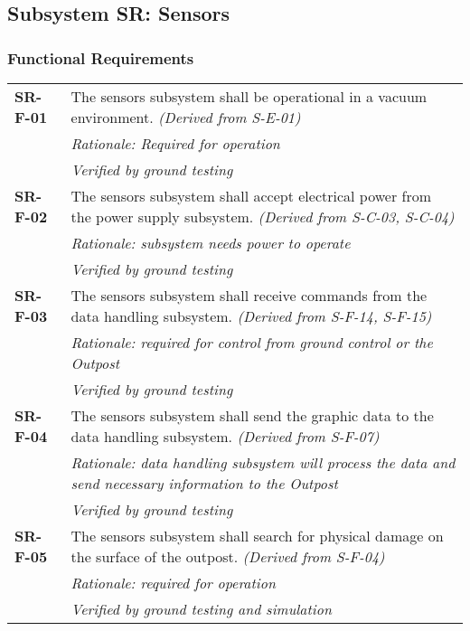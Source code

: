 \subsection{Subsystem SR: Sensors}
\label{sect:SR_req}
\subsubsection*{Functional Requirements}
\vspace{-15pt}
\begin{longtable}{P{2cm}P{13.25cm}}
\textbf{SR-F-01}	&
The sensors subsystem shall be operational in a vacuum environment.
\textit{(Derived from S-E-01)}	\\
& \textit{Rationale: Required for operation}	\\
& \textit{Verified by ground testing}	\\

\textbf{SR-F-02}	& The sensors subsystem shall accept electrical power from the power supply subsystem. 
\textit{(Derived from S-C-03, S-C-04)}	\\
& \textit{Rationale: subsystem needs power to operate}	\\
& \textit{Verified by ground testing}	\\

\textbf{SR-F-03}	& The sensors subsystem shall receive commands from the data handling subsystem. \textit{(Derived from S-F-14, S-F-15)} \\
 & \textit{Rationale: required for control from ground control or the Outpost} \\
 & \textit{Verified by ground testing}	\\

\textbf{SR-F-04}	& The sensors subsystem shall send the graphic data to the data handling subsystem. \textit{(Derived from S-F-07)} \\
 & \textit{Rationale: data handling subsystem will process the data and send necessary information to the Outpost} \\
 & \textit{Verified by ground testing}		\\

\textbf{SR-F-05}	& The sensors subsystem shall search for physical damage on the surface of the outpost. \textit{(Derived from S-F-04)} \\
 & \textit{Rationale: required for operation} \\
 & \textit{Verified by ground testing and simulation}	
\end{longtable}
\vspace{-15pt}
